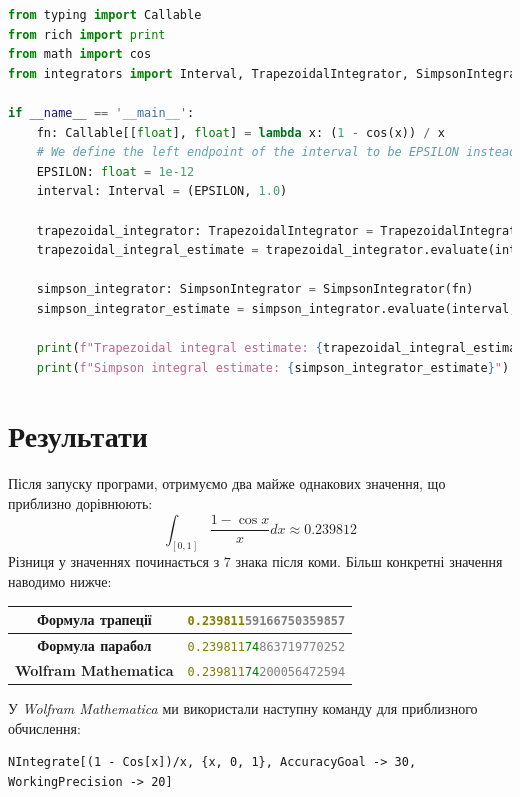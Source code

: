\documentclass[12pt]{extarticle}
\begin{document}
\begin{lstlisting}[language=Python, caption=Перевірка результатів]
from typing import Callable
from rich import print
from math import cos
from integrators import Interval, TrapezoidalIntegrator, SimpsonIntegrator

if __name__ == '__main__':
    fn: Callable[[float], float] = lambda x: (1 - cos(x)) / x
    # We define the left endpoint of the interval to be EPSILON instead of 0 to avoid division by zero
    EPSILON: float = 1e-12
    interval: Interval = (EPSILON, 1.0) 
    
    trapezoidal_integrator: TrapezoidalIntegrator = TrapezoidalIntegrator(fn)
    trapezoidal_integral_estimate = trapezoidal_integrator.evaluate(interval, accuracy=1e-6)
    
    simpson_integrator: SimpsonIntegrator = SimpsonIntegrator(fn)
    simpson_integrator_estimate = simpson_integrator.evaluate(interval, accuracy=1e-6)
    
    print(f"Trapezoidal integral estimate: {trapezoidal_integral_estimate}")
    print(f"Simpson integral estimate: {simpson_integrator_estimate}")
\end{lstlisting}

\pagebreak

\section{Результати}

Після запуску програми, отримуємо два майже однакових значення, що приблизно дорівнюють:
\[
\int_{[0,1]} \frac{1-\cos x}{x}dx \approx 0.239812
\]
Різниця у значеннях починається з $7$ знака після коми. Більш конкретні значення наводимо нижче:
\begin{center}
\begin{tabular}{ |c|c| } 
 \hline
 \textbf{Формула трапеції} & \texttt{\textcolor{olive}{0.239811}\textcolor{gray}{59166750359857}} \\
 \hline
 \textbf{Формула парабол} & \texttt{\textcolor{olive}{0.239811}\textcolor{green}{74}\textcolor{gray}{863719770252}} \\
 \hline
 \textbf{Wolfram Mathematica} & \texttt{\textcolor{olive}{0.239811}\textcolor{green}{74}\textcolor{gray}{200056472594}} \\
 \hline
\end{tabular}
\end{center}

У \textit{Wolfram Mathematica} ми використали наступну команду для приблизного обчислення:
\begin{lstlisting}[language=wolfram, caption=Обрахунок інтегралу в \textit{Wolfram Mathematica}]
NIntegrate[(1 - Cos[x])/x, {x, 0, 1}, AccuracyGoal -> 30, WorkingPrecision -> 20]
\end{lstlisting}
\end{document}
